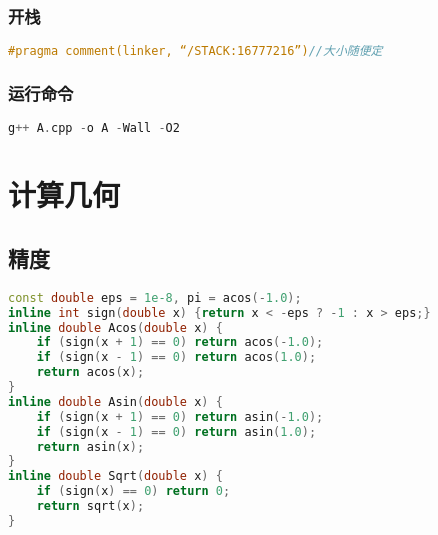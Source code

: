 \documentclass[landscape,a4paper]{article}
\begin{document}
	\begin{spacing}{0.3}	
	\begin{multicols}{2}
	
	\tableofcontents
	
	\subsubsection{开栈}
\begin{lstlisting}[language=C++]
#pragma comment(linker, “/STACK:16777216”)//大小随便定
\end{lstlisting}
\subsubsection{运行命令}
\begin{lstlisting}[language=C++]
g++ A.cpp -o A -Wall -O2
\end{lstlisting}
	
\section{计算几何}

\subsection{精度}
\begin{lstlisting}[language=C++]
const double eps = 1e-8, pi = acos(-1.0);
inline int sign(double x) {return x < -eps ? -1 : x > eps;}
inline double Acos(double x) {
	if (sign(x + 1) == 0) return acos(-1.0);
	if (sign(x - 1) == 0) return acos(1.0);
	return acos(x);
}
inline double Asin(double x) {
	if (sign(x + 1) == 0) return asin(-1.0);
	if (sign(x - 1) == 0) return asin(1.0);
	return asin(x);
}
inline double Sqrt(double x) {
	if (sign(x) == 0) return 0;
	return sqrt(x);
}
\end{lstlisting}

\end{multicols}
\end{spacing}
\end{document}
